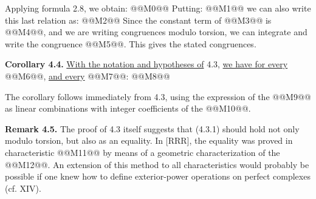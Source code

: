 Applying formula 2.8, we obtain:
@@M0@@
Putting:
@@M1@@
we can also write this last relation as:
@@M2@@
Since the constant term of @@M3@@ is @@M4@@, and we are writing congruences modulo torsion, we can integrate and write the congruence @@M5@@. This gives the stated congruences.

\textbf{Corollary 4.4.} \uline{With the notation and hypotheses of} 4.3, \uline{we have for every} @@M6@@, \uline{and every} @@M7@@:
@@M8@@

The corollary follows immediately from 4.3, using the expression of the @@M9@@ as linear combinations with integer coefficients of the @@M10@@.

\textbf{Remark 4.5.} The proof of 4.3 itself suggests that (4.3.1) should hold not only modulo torsion, but also as an equality. In [RRR], the equality was proved in characteristic @@M11@@ by means of a geometric characterization of the @@M12@@. An extension of this method to all characteristics would probably be possible if one knew how to define exterior-power operations on perfect complexes (cf. XIV).
